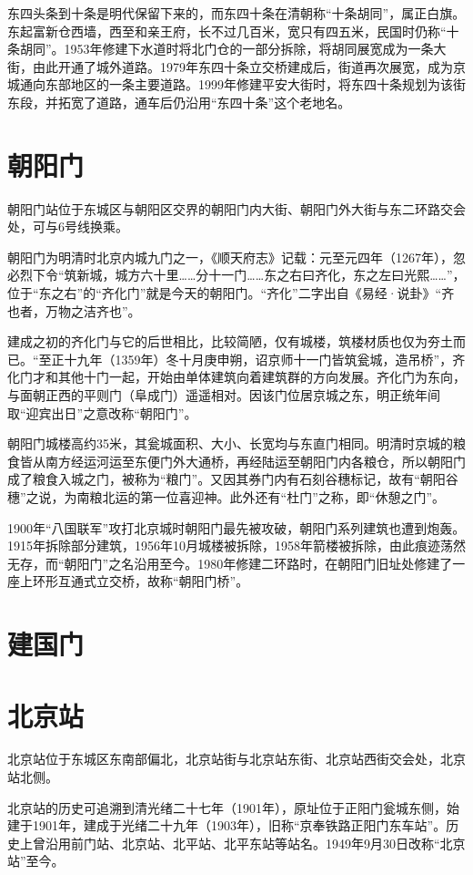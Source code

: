 东四头条到十条是明代保留下来的，而东四十条在清朝称“十条胡同”，属正白旗。东起富新仓西墙，西至和亲王府，长不过几百米，宽只有四五米，民国时仍称“十条胡同”。1953年修建下水道时将北门仓的一部分拆除，将胡同展宽成为一条大街，由此开通了城外道路。1979年东四十条立交桥建成后，街道再次展宽，成为京城通向东部地区的一条主要道路。1999年修建平安大街时，将东四十条规划为该街东段，并拓宽了道路，通车后仍沿用“东四十条”这个老地名。

\section{朝阳门}
朝阳门站位于东城区与朝阳区交界的朝阳门内大街、朝阳门外大街与东二环路交会处，可与6号线换乘。

朝阳门为明清时北京内城九门之一，《顺天府志》记载：元至元四年（1267年），忽必烈下令“筑新城，城方六十里……分十一门……东之右曰齐化，东之左曰光熙……”，位于“东之右”的“齐化门”就是今天的朝阳门。“齐化”二字出自《易经·说卦》“齐也者，万物之洁齐也”。

建成之初的齐化门与它的后世相比，比较简陋，仅有城楼，筑楼材质也仅为夯土而已。“至正十九年（1359年）冬十月庚申朔，诏京师十一门皆筑瓮城，造吊桥”，齐化门才和其他十门一起，开始由单体建筑向着建筑群的方向发展。齐化门为东向，与面朝正西的平则门（阜成门）遥遥相对。因该门位居京城之东，明正统年间取“迎宾出日”之意改称“朝阳门”。

朝阳门城楼高约35米，其瓮城面积、大小、长宽均与东直门相同。明清时京城的粮食皆从南方经运河运至东便门外大通桥，再经陆运至朝阳门内各粮仓，所以朝阳门成了粮食入城之门，被称为“粮门”。又因其券门内有石刻谷穗标记，故有“朝阳谷穗”之说，为南粮北运的第一位喜迎神。此外还有“杜门”之称，即“休憩之门”。

1900年“八国联军”攻打北京城时朝阳门最先被攻破，朝阳门系列建筑也遭到炮轰。1915年拆除部分建筑，1956年10月城楼被拆除，1958年箭楼被拆除，由此痕迹荡然无存，而“朝阳门”之名沿用至今。1980年修建二环路时，在朝阳门旧址处修建了一座上环形互通式立交桥，故称“朝阳门桥”。

\section{建国门}

\section{北京站}
北京站位于东城区东南部偏北，北京站街与北京站东街、北京站西街交会处，北京站北侧。

北京站的历史可追溯到清光绪二十七年（1901年），原址位于正阳门瓮城东侧，始建于1901年，建成于光绪二十九年（1903年），旧称“京奉铁路正阳门东车站”。历史上曾沿用前门站、北京站、北平站、北平东站等站名。1949年9月30日改称“北京站”至今。

